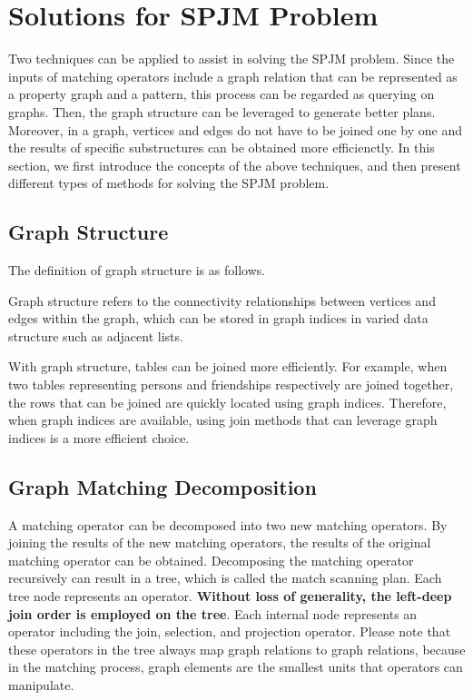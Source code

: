 \section{Solutions for SPJM Problem}
Two techniques can be applied to assist in solving the SPJM problem.
Since the inputs of matching operators include a graph relation that can be represented as a property graph and a pattern, this process can be regarded as querying on graphs.
Then, the graph structure can be leveraged to generate better plans.
Moreover, in a graph, vertices and edges do not have to be joined one by one and the results of specific substructures can be obtained more efficienctly.
In this section, we first introduce the concepts of the above techniques, and then present different types of methods for solving the SPJM problem.

\subsection{Graph Structure}

The definition of graph structure is as follows.

\begin{definition}
    Graph structure refers to the connectivity relationships between vertices and edges within the graph, which can be stored in graph indices in varied data structure such as adjacent lists.
\end{definition}

With graph structure, tables can be joined more efficiently.
For example, when two tables representing persons and friendships respectively are joined together, the rows that can be joined are quickly located using graph indices.
Therefore, when graph indices are available, using join methods that can leverage graph indices is a more efficient choice.

\subsection{Graph Matching Decomposition}

A matching operator can be decomposed into two new matching operators.
By joining the results of the new matching operators, the results of the original matching operator can be obtained.
Decomposing the matching operator recursively can result in a tree, which is called the match scanning plan.
Each tree node represents an operator.
\textbf{Without loss of generality, the left-deep join order is employed on the tree}.
Each internal node represents an operator including the join, selection, and projection operator.
Please note that these operators in the tree always map graph relations to graph relations, because in the matching process, graph elements are the smallest units that operators can manipulate.

